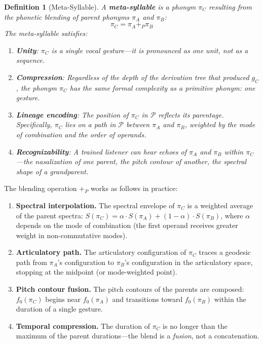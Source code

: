 \documentclass[12pt, letterpaper]{book}
\def\equiv{=}%
\def\oplus{+}%
\def\mathfrak#1{#1}%
\newtheorem{definition}{Definition}[chapter]
\begin{document}
\begin{definition}[Meta-Syllable]\label{def:meta-syllable}\label{sec:phonetic-blend}
A \textbf{meta-syllable} is a phonym $\pi_C$ resulting from the phonetic blending of parent phonyms $\pi_A$ and $\pi_B$:
\[
\pi_C \equiv \pi_A \oplus_P \pi_B
\]
The meta-syllable satisfies:
\begin{enumerate}[label=(\roman*)]
    \item \textbf{Unity}: $\pi_C$ is a single vocal gesture---it is pronounced as one unit, not as a sequence.
    \item \textbf{Compression}: Regardless of the depth of the derivation tree that produced $\mathfrak{g}_C$, the phonym $\pi_C$ has the same formal complexity as a primitive phonym: one gesture.
    \item \textbf{Lineage encoding}: The position of $\pi_C$ in $\mathcal{P}$ reflects its parentage. Specifically, $\pi_C$ lies on a path in $\mathcal{P}$ between $\pi_A$ and $\pi_B$, weighted by the mode of combination and the order of operands.
    \item \textbf{Recognizability}: A trained listener can hear echoes of $\pi_A$ and $\pi_B$ within $\pi_C$---the nasalization of one parent, the pitch contour of another, the spectral shape of a grandparent.
\end{enumerate}
\end{definition}

The blending operation $\oplus_P$ works as follows in practice:

\begin{enumerate}[label=\textbf{Step \arabic*:}]
    \item \textbf{Spectral interpolation.} The spectral envelope of $\pi_C$ is a weighted average of the parent spectra: $S(\pi_C) \equiv \alpha \cdot S(\pi_A) + (1 - \alpha) \cdot S(\pi_B)$, where $\alpha$ depends on the mode of combination (the first operand receives greater weight in non-commutative modes).
    \item \textbf{Articulatory path.} The articulatory configuration of $\pi_C$ traces a geodesic path from $\pi_A$'s configuration to $\pi_B$'s configuration in the articulatory space, stopping at the midpoint (or mode-weighted point).
    \item \textbf{Pitch contour fusion.} The pitch contours of the parents are composed: $f_0(\pi_C)$ begins near $f_0(\pi_A)$ and transitions toward $f_0(\pi_B)$ within the duration of a single gesture.
    \item \textbf{Temporal compression.} The duration of $\pi_C$ is no longer than the maximum of the parent durations---the blend is a \textit{fusion}, not a concatenation.
\end{enumerate}
\end{document}
